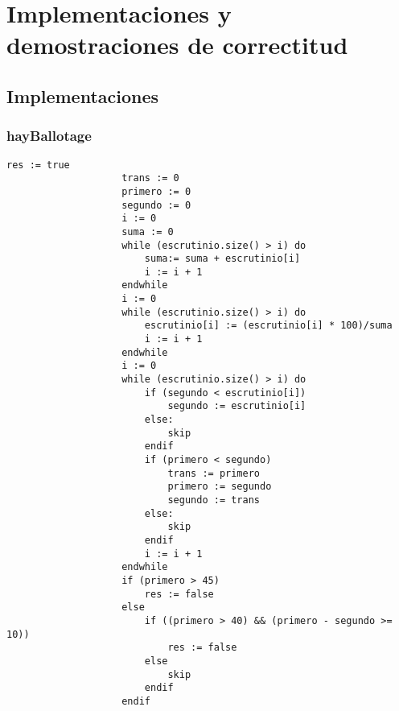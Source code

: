 \documentclass[10pt,a4paper]{article}
\begin{document}

	





	


\section{Implementaciones y demostraciones de correctitud}

	\subsection{Implementaciones}
		
		\subsubsection{hayBallotage}
			\begin{minipage}[t]{\textwidth}
				\begin{lstlisting}[label=code:for]
					res := true
					trans := 0
					primero := 0
					segundo := 0
					i := 0
					suma := 0
					while (escrutinio.size() > i) do
						suma:= suma + escrutinio[i]
						i := i + 1
					endwhile
					i := 0
					while (escrutinio.size() > i) do
						escrutinio[i] := (escrutinio[i] * 100)/suma
						i := i + 1
					endwhile
					i := 0
					while (escrutinio.size() > i) do 
						if (segundo < escrutinio[i])
							segundo := escrutinio[i]
						else:
							skip
						endif
						if (primero < segundo)
							trans := primero
							primero := segundo
							segundo := trans
						else:
							skip
						endif
						i := i + 1
					endwhile
					if (primero > 45)
						res := false
					else
						if ((primero > 40) && (primero - segundo >= 10))
							res := false
						else
							skip
						endif
					endif

				\end{lstlisting}
			\end{minipage}
\end{document}
